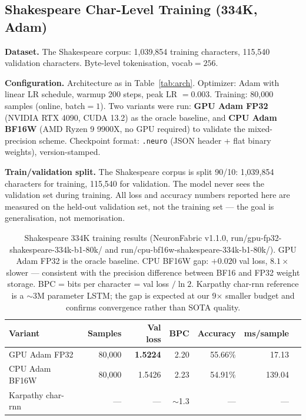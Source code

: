 \documentclass[11pt]{article}
\newcommand{\bfsixteenloss}{0.020}
\newcommand{\gpuvaloss}{1.5224}
\newcommand{\cpubfvaloss}{1.5426}
\newcommand{\repoversion}{v1.1.0}
\begin{document}
\subsection{Shakespeare Char-Level Training (334K, Adam)}

\textbf{Dataset.} The Shakespeare corpus: 1,039,854 training characters,
115,540 validation characters. Byte-level tokenisation, vocab$=256$.

\textbf{Configuration.} Architecture as in Table~\ref{tab:arch}.
Optimizer: Adam with linear LR schedule, warmup 200 steps, peak LR $= 0.003$.
Training: 80,000 samples (online, batch$=1$).
Two variants were run: \textbf{GPU Adam FP32} (NVIDIA RTX 4090, CUDA 13.2) as the oracle
baseline, and \textbf{CPU Adam BF16W} (AMD Ryzen 9 9900X, no GPU required) to validate
the mixed-precision scheme.
Checkpoint format: \texttt{.neuro} (JSON header + flat binary weights), version-stamped.

\textbf{Train/validation split.} The Shakespeare corpus is split 90/10:
1,039,854 characters for training, 115,540 for validation.
The model never sees the validation set during training.
All loss and accuracy numbers reported here are measured on the held-out validation set,
not the training set --- the goal is generalisation, not memorisation.

\begin{table}[H]
\centering
\begin{tabular}{lrrrrrr}
\toprule
Variant & Samples & Val loss & BPC & Accuracy & ms/sample \\
\midrule
GPU Adam FP32  & 80,000 & \textbf{\gpuvaloss} & 2.20 & 55.66\% & 17.13 \\
    CPU Adam BF16W & 80,000 & \cpubfvaloss & 2.23 & 54.91\% & 139.04 \\
\midrule
Karpathy char-rnn~\cite{karpathy2015charrnn} & --- & --- & $\sim$1.3 & --- & --- \\
\bottomrule
\end{tabular}
\caption{Shakespeare 334K training results (NeuronFabric \repoversion, run/gpu-fp32-shakespeare-334k-b1-80k/ and run/cpu-bf16w-shakespeare-334k-b1-80k/).
GPU Adam FP32 is the oracle baseline.
CPU BF16W gap: $+\bfsixteenloss$ val loss, $8.1\times$ slower --- consistent with the precision difference between BF16 and FP32 weight storage.
BPC = bits per character = val loss $/ \ln 2$. Karpathy char-rnn reference is a $\sim$3M parameter LSTM; the gap is expected at our 9$\times$ smaller budget and confirms convergence rather than SOTA quality.}
\label{tab:shakespeare-results}
\end{table}
\end{document}
